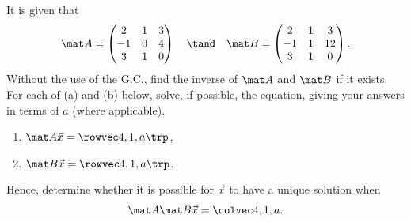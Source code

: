 \begin{problem}
    It is given that \[\mat A = \begin{pmatrix}2 & 1 & 3  \\ -1 & 0 & 4 \\ 3 & 1 & 0\end{pmatrix} \quad \tand \quad \mat B = \begin{pmatrix} 2 & 1 & 3 \\ -1 & 1 & 12 \\ 3 & 1 & 0 \end{pmatrix}.\] Without the use of the G.C., find the inverse of $\mat A$ and $\mat B$ if it exists. For each of (a) and (b) below, solve, if possible, the equation, giving your answers in terms of $a$ (where applicable).

    \begin{enumerate}
        \item $\mat A \vec x = \cveciiix41a$,
        \item $\mat B \vec x = \cveciiix41a$.
    \end{enumerate}

    Hence, determine whether it is possible for $\vec x$ to have a unique solution when \[\mat A \mat B \vec x = \cveciii41a.\]
\end{problem}
